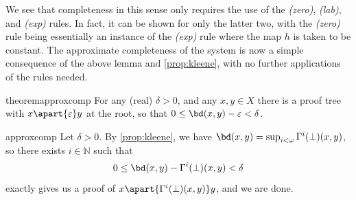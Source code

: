 We see that completeness in this sense only requires the use of the \emph{(zero)}, \emph{(lab)}, and \emph{(exp)} rules. In fact, it can be shown for only the latter two, with the \emph{(zero)} rule being essentially an instance of the \emph{(exp)} rule where the map \(h\) is taken to be constant. The approximate completeness of the system is now a simple consequence of the above lemma and \cref{prop:kleene}, with no further applications of the rules needed.
\begin{restatable}{theorem}{approxcomp}\label{thm:approxcomp}
	For any (real) \(\delta > 0\), and any \(x,y \in X\) there is a proof tree with \(x \apart{\varepsilon} y\) at the root, so that \(0 \leq \bd(x,y) - \varepsilon < \delta\).
\end{restatable}
\begin{proofappendix}{approxcomp}
	Let \(\delta > 0\). By \cref{prop:kleene}, we have \(\bd(x,y) = \sup_{i < \omega} \Gamma^i(\bot)(x,y)\), so there exists \(i \in \mathbb{N}\) such that
	\[
		0 \leq \bd(x,y) - \Gamma^i(\bot)(x,y) < \delta
	\]
	 exactly gives us a proof of \(x \apart{\Gamma^i(\bot)(x,y)} y\), and we are done.
\end{proofappendix}
